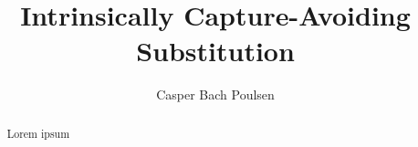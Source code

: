\documentclass[12pt,a4paper]{article}
\title{Intrinsically Capture-Avoiding Substitution}
\author{Casper Bach Poulsen}
\date{}
\begin{document}
\maketitle

\begin{abstract}
  Lorem ipsum
\end{abstract}











\end{document}
